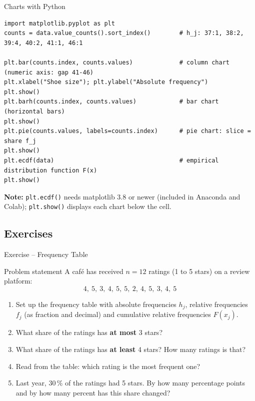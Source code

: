 \documentclass[aspectratio=169,11pt]{beamer}
\begin{document}
\begin{frame}[fragile]{Charts with Python}
\begin{lstlisting}[keepspaces=true]
import matplotlib.pyplot as plt
counts = data.value_counts().sort_index()        # h_j: 37:1, 38:2, 39:4, 40:2, 41:1, 46:1

plt.bar(counts.index, counts.values)             # column chart (numeric axis: gap 41-46)
plt.xlabel("Shoe size"); plt.ylabel("Absolute frequency")
plt.show()
plt.barh(counts.index, counts.values)            # bar chart (horizontal bars)
plt.show()
plt.pie(counts.values, labels=counts.index)      # pie chart: slice = share f_j
plt.show()
plt.ecdf(data)                                   # empirical distribution function F(x)
plt.show()
\end{lstlisting}
{\small \textbf{Note:} \texttt{plt.ecdf()} needs matplotlib 3.8 or newer (included in Anaconda
and Colab); \texttt{plt.show()} displays each chart below the cell.}
\end{frame}

\subsection{Exercises}

\begin{frame}{Exercise -- Frequency Table}
  \begin{block}{Problem statement}
    A café has received $n = 12$ ratings (1 to 5 stars) on a review platform:
    \[ 4,\ 5,\ 3,\ 4,\ 5,\ 5,\ 2,\ 4,\ 5,\ 3,\ 4,\ 5 \]
    \begin{enumerate}
      \item[a)] Set up the frequency table with absolute frequencies $h_j$, relative
        frequencies $f_j$ (as fraction and decimal) and cumulative relative frequencies $F(x_j)$.
      \item[b)] What share of the ratings has \textbf{at most} 3 stars?
      \item[c)] What share of the ratings has \textbf{at least} 4 stars? How many ratings is that?
      \item[d)] Read from the table: which rating is the most frequent one?
      \item[e)] Last year, 30\,\% of the ratings had 5 stars. By how many percentage points
        and by how many percent has this share changed?
    \end{enumerate}
  \end{block}
\end{frame}
\end{document}
